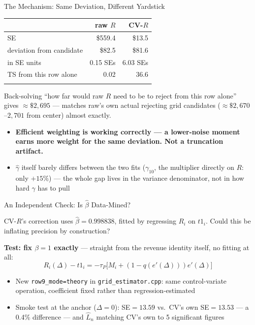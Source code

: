 \documentclass[
  ignorenonframetext,
  aspectratio=169,
]{beamer}
\newcounter{none} %
\providecommand{\tightlist}{%
  \setlength{\itemsep}{0pt}\setlength{\parskip}{0pt}}
\begin{document}
\begin{frame}{The Mechanism: Same Deviation, Different Yardstick}
\protect{}\label{the-mechanism-same-deviation-different-yardstick}
\footnotesize

{\def\LTcaptype{none} %
\begin{longtable}[]{@{}lrr@{}}
\toprule\noalign{}
& raw \(R\) & CV-\(R\) \\
\midrule\noalign{}
\endhead
SE & \$559.4 & \$13.5 \\
deviation from candidate & \$82.5 & \$81.6 \\
in SE units & 0.15 SEs & 6.03 SEs \\
TS from this row alone & 0.02 & 36.6 \\
\bottomrule\noalign{}
\end{longtable}
}

Back-solving ``how far would raw \(R\) need to be to reject from this
row alone'' gives \(\approx\$2{,}695\) --- matches raw's own actual
rejecting grid candidates (\(\approx\$2{,}670\)--\(2{,}701\) from
center) almost exactly.

\begin{itemize}
\tightlist
\item
  \textbf{Efficient weighting is working correctly --- a lower-noise
  moment earns more weight for the same deviation. Not a truncation
  artifact.}
\item
  \(\hat\gamma\) itself barely differs between the two fits
  (\(\gamma_{10}\), the multiplier directly on \(R\): only \(+15\%\))
  --- the whole gap lives in the variance denominator, not in how hard
  \(\gamma\) has to pull
\end{itemize}
\end{frame}

\begin{frame}[fragile]{An Independent Check: Is \(\hat\beta\)
Data-Mined?}
\protect{}\label{an-independent-check-is-hatbeta-data-mined}
\footnotesize

CV-\(R\)'s correction uses \(\hat\beta=0.998838\), fitted by regressing
\(R_i\) on \(t1_i\). Could this be inflating precision by construction?

\textbf{Test: fix \(\beta=1\) exactly} --- straight from the revenue
identity itself, no fitting at all: \[
R_i(\Delta)-t1_i = -\tau_P\big[M_i+(1-q(e'(\Delta)))e'(\Delta)\big]
\]

\begin{itemize}
\tightlist
\item
  New \texttt{row9\_mode=theory} in \texttt{grid\_estimator.cpp}: same
  control-variate operation, coefficient fixed rather than
  regression-estimated
\item
  Smoke test at the anchor (\(\Delta=0\)): SE\(=13.59\) vs.~CV's own
  SE\(=13.53\) --- a 0.4\% difference --- and \(\hat L_n\) matching CV's
  own to 5 significant figures
\end{itemize}
\end{frame}
\end{document}
